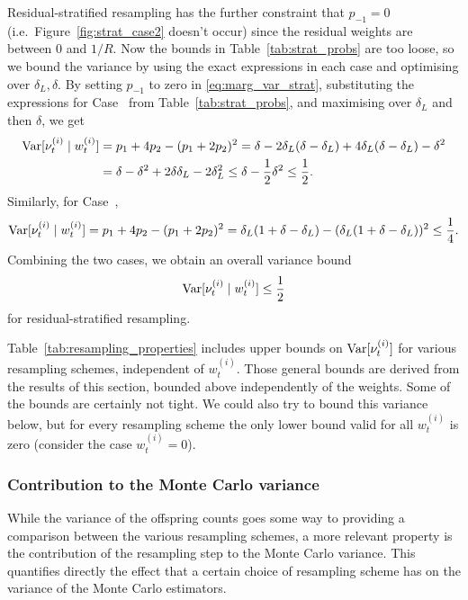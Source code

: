 Residual-stratified resampling has the further constraint that $p_{-1} =0$ (i.e.\ Figure~\ref{fig:strat_case2} doesn't occur) since the residual weights are between $0$ and $1/R$. Now the bounds in Table~\ref{tab:strat_probs} are too loose, so we bound the variance by using the exact expressions in each case and optimising over $\delta_L, \delta$.
By setting $p_{-1}$ to zero in \eqref{eq:marg_var_strat}, substituting the expressions for Case~ from Table~\ref{tab:strat_probs}, and maximising over $\delta_L$ and then $\delta$, we get
\begin{align*}
\operatorname{Var}[ \nu_t^{(i)} \mid w_t^{(i)} ]
&= p_1 + 4p_2 - (p_1 + 2p_2)^2 
= \delta - 2\delta_L(\delta-\delta_L) + 4\delta_L(\delta-\delta_L) -\delta^2 \\
&= \delta - \delta^2 + 2\delta\delta_L - 2\delta_L^2
\leq \delta - \frac{1}{2}\delta^2
\leq \frac{1}{2} .
\end{align*}
Similarly, for Case~,
\begin{equation*}
\operatorname{Var}[ \nu_t^{(i)} \mid w_t^{(i)} ]
= p_1 + 4p_2 - (p_1 + 2p_2)^2 
= \delta_L(1+\delta-\delta_L) - (\delta_L(1+\delta-\delta_L))^2
\leq \frac{1}{4} .
\end{equation*}
Combining the two cases, we obtain an overall variance bound
\begin{equation*}
\operatorname{Var}[ \nu_t^{(i)} \mid w_t^{(i)} ]
\leq \frac{1}{2}
\end{equation*}
for residual-stratified resampling.

Table~\ref{tab:resampling_properties} includes upper bounds on $\operatorname{Var}[\nu_t^{(i)}]$ for various resampling schemes, independent of $w_t^{(i)}$. Those general bounds are derived from the results of this section, bounded above independently of the weights. Some of the bounds are certainly not tight.
We could also try to bound this variance below, but for every resampling scheme the only lower bound valid for all $w_t^{(i)}$ is zero (consider the case $w_t^{(i)}=0$).





\subsubsection{Contribution to the Monte Carlo variance}

While the variance of the offspring counts goes some way to providing a comparison between the various resampling schemes, a more relevant property is the contribution of the resampling step to the Monte Carlo variance.
This quantifies directly the effect that a certain choice of resampling scheme has on the variance of the Monte Carlo estimators.

